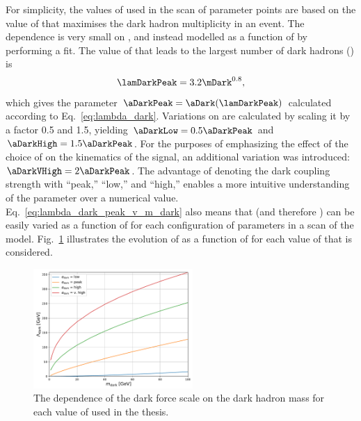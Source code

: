 For simplicity, the values of \aDark used in the scan of parameter points are based on the value of \lamDark that maximises the dark hadron multiplicity in an event. The dependence is very small on \mZprime, and instead modelled as a function of \mDark by performing a fit. The value of \lamDark that leads to the largest number of dark hadrons (\lamDarkPeak) is
\begin{equation}
    \lamDarkPeak = 3.2 \mDark^{0.8},
    \label{eq:lambda_dark_peak_v_m_dark}
\end{equation}
which gives the parameter $\aDarkPeak = \aDark(\lamDarkPeak)$ calculated according to Eq.~\ref{eq:lambda_dark}. Variations on \aDark are calculated by scaling it by a factor 0.5 and 1.5, yielding $\aDarkLow = \text{0.5}\aDarkPeak$ and $\aDarkHigh = \text{1.5}\aDarkPeak$. For the purposes of emphasizing the effect of the choice of \aDark on the kinematics of the signal, an additional variation was introduced: $\aDarkVHigh = \text{2}\aDarkPeak$. The advantage of denoting the dark coupling strength with ``peak,'' ``low,'' and ``high,'' enables a more intuitive understanding of the parameter over a numerical value. Eq.~\ref{eq:lambda_dark_peak_v_m_dark} also means that \lamDark (and therefore \aDark) can be easily varied as a function of \mDark for each configuration of parameters in a scan of the model. Fig.~\ref{fig:svj_lamDark_vs_mDark} illustrates the evolution of \lamDark as a function of \mDark for each value of \aDark that is considered.

\begin{figure}[htbp]
    \centering
    \includegraphics[width=0.54\textwidth]{figures/lambda_dark_vs_mDark_with_vHigh.pdf}
    \caption[The dependence of the dark force scale \lamDark on the dark hadron mass \mDark for each value of \aDark used in the thesis]{The dependence of the dark force scale \lamDark on the dark hadron mass \mDark for each value of \aDark used in the thesis.}
    \label{fig:svj_lamDark_vs_mDark}
\end{figure}


